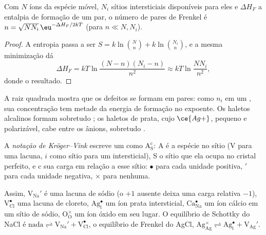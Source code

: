 \begin{proposition}\label{prop:b3:solid-state:frenkel}
Com $N$ íons da espécie móvel, $N_i$ sítios intersticiais disponíveis para eles e
$\Delta H_F$ a entalpia de formação de um par, o número de pares de Frenkel é $n =
\sqrt{NN_i}\,\eu^{-\Delta H_F/2kT}$ (para $n \ll N, N_i$).
\end{proposition}

\begin{proof}
A entropia passa a ser $S = k\ln\binom{N}{n} + k\ln\binom{N_i}{n}$, e a mesma minimização dá
\[
  \Delta H_F = kT\ln\frac{(N - n)(N_i - n)}{n^2} \approx kT\ln\frac{NN_i}{n^2},
\]
donde o resultado.
\end{proof}

A raiz quadrada mostra que os defeitos se formam em pares: como $n_i$ em um ,
sua concentração tem metade da energia de formação no expoente. Os haletos
alcalinos formam sobretudo ; os haletos de prata, cujo
$\ce{Ag+}$, pequeno e polarizável, cabe entre os ânions, sobretudo .

\begin{definition}\label{def:b3:solid-state:kroger-vink}
A \emph{notação de Kröger--Vink} escreve um 
como $\mathrm{A_S^c}$: A é a espécie no sítio (V para uma lacuna, $i$ como sítio
para um intersticial), S o sítio que ela ocupa no cristal perfeito, e c sua
carga em relação a esse sítio: $\bullet$ para cada unidade positiva, $'$ para cada unidade
negativa, $\times$ para nenhuma.
\end{definition}

Assim, $\mathrm{V_{Na}'}$ é uma lacuna de sódio (o $+1$ ausente deixa uma carga relativa $-1$),
$\mathrm{V_{Cl}^{\bullet}}$ uma lacuna de cloreto, $\mathrm{Ag_i^{\bullet}}$ um íon prata intersticial, $\mathrm{Ca_{Na}^{\bullet}}$ um íon cálcio em um
sítio de sódio, $\mathrm{O_O^{\times}}$ um íon óxido em seu lugar. O equilíbrio de Schottky do NaCl é
$\text{nada} \rightleftharpoons \mathrm{V_{Na}' + V_{Cl}^{\bullet}}$, o equilíbrio de Frenkel do AgCl,
$\mathrm{Ag_{Ag}^{\times}} \rightleftharpoons \mathrm{Ag_i^{\bullet} + V_{Ag}'}$.

